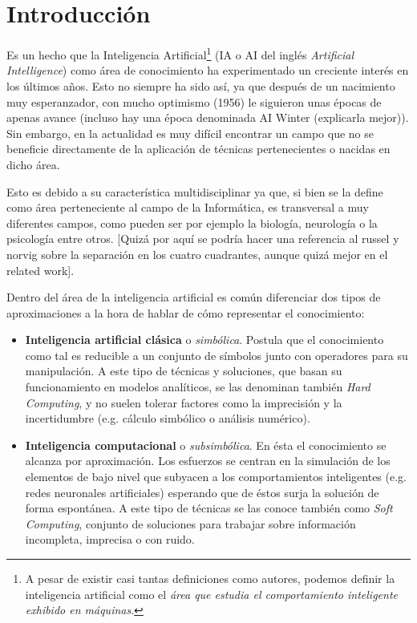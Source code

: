 \chapter{Introducción}
\label{ch:intro}

Es un hecho que la Inteligencia Artificial\footnote{A pesar de existir casi tantas definiciones como autores, podemos definir la inteligencia artificial como el \textit{área que estudia el comportamiento inteligente exhibido en máquinas}.} (IA o AI del inglés \textit{Artificial Intelligence}) como área de conocimiento ha experimentado un creciente interés en los últimos años. Esto no siempre ha sido así, ya que después de un nacimiento muy esperanzador, con mucho optimismo (1956) le siguieron unas épocas de apenas avance (incluso hay una época denominada AI Winter (explicarla mejor)). Sin embargo, en la actualidad es muy difícil encontrar un campo que no se beneficie directamente de la aplicación de técnicas pertenecientes o nacidas en dicho área.

Esto es debido a su característica multidisciplinar ya que, si bien se la define como área perteneciente al campo de la Informática, es transversal a muy diferentes campos, como pueden ser por ejemplo la biología, neurología o la psicología entre otros. [Quizá por aquí se podría hacer una referencia al russel y norvig sobre la separación en los cuatro cuadrantes, aunque quizá mejor en el related work].

Dentro del área de la inteligencia artificial es común diferenciar dos tipos de aproximaciones a la hora de hablar de cómo representar el conocimiento:

\begin{itemize}
	\item \textbf{Inteligencia artificial clásica} o \textit{simbólica}. Postula que el conocimiento como tal es reducible a un conjunto de símbolos junto con operadores para su manipulación. A este tipo de técnicas y soluciones, que basan su funcionamiento en modelos analíticos, se las denominan también \textit{Hard Computing}, y no suelen tolerar factores como la imprecisión y la incertidumbre (e.g. cálculo simbólico o análisis numérico).
	\item \textbf{Inteligencia computacional} o \textit{subsimbólica}. En ésta el conocimiento se alcanza por aproximación. Los esfuerzos se centran en la simulación de los elementos de bajo nivel que subyacen a los comportamientos inteligentes (e.g. redes neuronales artificiales) esperando que de éstos surja la solución de forma espontánea. A este tipo de técnicas se las conoce también como \textit{Soft Computing}, conjunto de soluciones para trabajar sobre información incompleta, imprecisa o con ruido.
\end{itemize}

